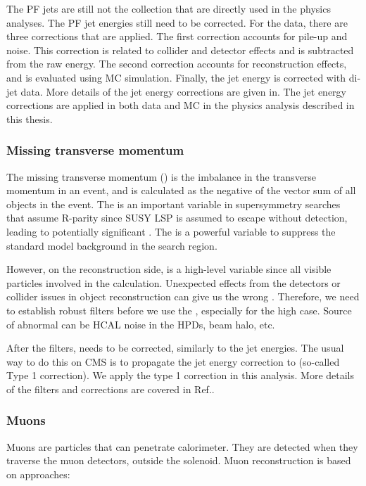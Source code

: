 The PF jets are still not the collection that are directly used in the physics analyses. The PF jet energies still need to be corrected. For the data, there are three corrections that are applied. The first correction accounts for pile-up and noise. This correction is related to collider and detector effects and is subtracted from the raw energy. The second correction accounts for reconstruction effects, and is evaluated using MC simulation. Finally, the jet energy is corrected with di-jet data. More details of the jet energy corrections are given in\cite{1748-0221-6-11-P11002}. The jet energy corrections are applied in both data and MC in the physics analysis described in this thesis. 

\subsubsection{Missing transverse momentum}

The missing transverse momentum (\MET) is the imbalance in the transverse momentum in an event, and is calculated as the negative of the vector sum of all objects in the event. The \MET is an important variable in supersymmetry searches that assume R-parity since SUSY LSP is assumed to escape without detection, leading to potentially significant \MET. The \MET is a powerful variable to suppress the standard model background in the search region. 

However, on the reconstruction side, \MET is a high-level variable since all visible particles involved in the calculation. Unexpected effects from the detectors or collider issues in object reconstruction can give us the wrong \MET. Therefore, we need to establish robust \MET filters before we use the \MET, especially for the high \MET case. Source of abnormal \MET can be HCAL noise in the HPDs, beam halo, etc. 

After the filters, \MET needs to be corrected, similarly to the jet energies. The usual way to do this on CMS is to propagate the jet energy correction to \MET (so-called Type 1 correction). We apply the type 1 correction in this analysis. More details of the \MET filters and corrections are covered in Ref.\cite{CMS-PAS-JME-16-004}. 


\subsubsection{Muons}
Muons are particles that can penetrate calorimeter.  They are detected when they traverse the muon detectors, outside the solenoid. Muon reconstruction is based on approaches: 


